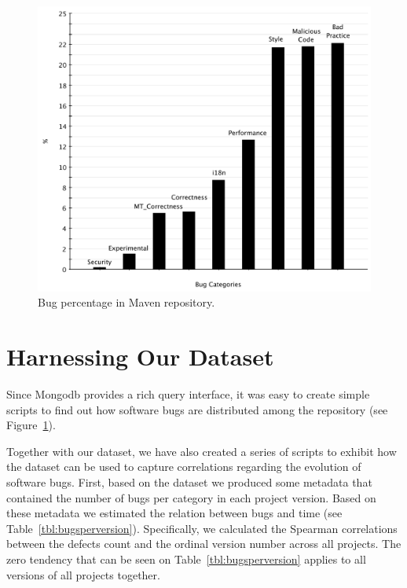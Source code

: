 \documentclass{sig-alternate}
\begin{document}
\begin{figure}[t]
	\centering
	\includegraphics[scale=0.32]{figures/bug_percent}
	\caption{Bug percentage in Maven repository.}
	\label{fig:bug-per} 
\end{figure}


\section{Harnessing Our Dataset}
\label{sec:exploit}

Since Mongo{\sc db} provides a rich query interface,
it was easy to create
simple scripts to find out
how software bugs are distributed among the
repository (see Figure~\ref{fig:bug-per}).

Together with our dataset, we have also created a series of
scripts to exhibit how the dataset can be used
to capture correlations regarding
the evolution of software bugs.
First, based on the dataset we produced some metadata
that contained the number of
bugs per category in each project version. Based
on these metadata we estimated the relation between
bugs and time (see Table~\ref{tbl:bugsperversion}).
Specifically, we calculated the Spearman correlations between the defects
count and the ordinal version number across all projects.
The zero tendency that can be seen on Table~\ref{tbl:bugsperversion}
applies to all versions of all projects together.
\end{document}
